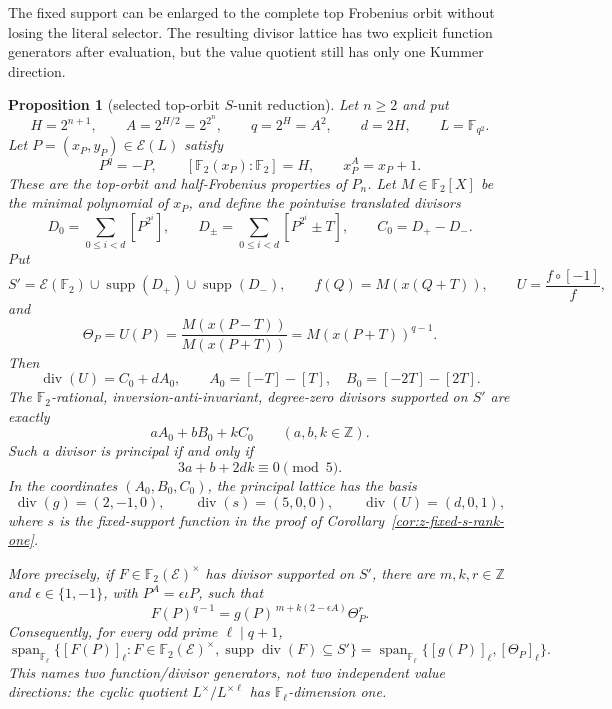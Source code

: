 \documentclass[11pt]{article}
\newtheorem{proposition}[theorem]{Proposition}
\theoremstyle{definition}
\theoremstyle{remark}
\begin{document}
The fixed support can be enlarged to the complete top Frobenius orbit without
losing the literal selector.  The resulting divisor lattice has two explicit
function generators after evaluation, but the value quotient still has only
one Kummer direction.

\begin{proposition}[selected top-orbit $S$-unit reduction]
\label{prop:z-top-orbit-units}
Let $n\geq2$ and put
\[
 H=2^{n+1},\qquad A=2^{H/2}=2^{2^n},\qquad
 q=2^H=A^2,\qquad d=2H,\qquad L=\mathbb F_{q^2}.
\]
Let $P=(x_P,y_P)\in\mathcal E(L)$ satisfy
\[
 P^q=-P,\qquad [\mathbb F_2(x_P):\mathbb F_2]=H,
 \qquad x_P^A=x_P+1.
\]
These are the top-orbit and half-Frobenius properties of $P_n$.  Let
$M\in\mathbb F_2[X]$ be the minimal polynomial of $x_P$, and define the
pointwise translated divisors
\[
 D_0=\sum_{0\leq i<d}[P^{2^i}],\qquad
 D_\pm=\sum_{0\leq i<d}[P^{2^i}\pm T],\qquad
 C_0=D_+-D_-.
\]
Put
\[
 S'=\mathcal E(\mathbb F_2)\cup\operatorname{supp}(D_+)
       \cup\operatorname{supp}(D_-),
 \qquad f(Q)=M(x(Q+T)),
 \qquad U=\frac{f\circ[-1]}f,
\]
and
\[
 \Theta_P=U(P)
 =\frac{M(x(P-T))}{M(x(P+T))}
 =M(x(P+T))^{q-1}.
\]
Then
\[
 \operatorname{div}(U)=C_0+dA_0,
 \qquad A_0=[-T]-[T],\quad B_0=[-2T]-[2T].
\]
The $\mathbb F_2$-rational, inversion-anti-invariant, degree-zero divisors
supported on $S'$ are exactly
\[
 aA_0+bB_0+kC_0\qquad(a,b,k\in\mathbb Z).
\]
Such a divisor is principal if and only if
\[
 3a+b+2dk\equiv0\pmod5.
\]
In the coordinates $(A_0,B_0,C_0)$, the principal lattice has the basis
\[
 \operatorname{div}(g)=(2,-1,0),\qquad
 \operatorname{div}(s)=(5,0,0),\qquad
 \operatorname{div}(U)=(d,0,1),
\]
where $s$ is the fixed-support function in the proof of
Corollary~\ref{cor:z-fixed-s-rank-one}.

More precisely, if $F\in\mathbb F_2(\mathcal E)^\times$ has divisor supported
on $S'$, there are $m,k,r\in\mathbb Z$ and
$\epsilon\in\{1,-1\}$, with $P^A=\epsilon\iota P$, such that
\[
 F(P)^{q-1}=g(P)^{\,m+k(2-\epsilon A)}\Theta_P^r.
\]
Consequently, for every odd prime $\ell\mid q+1$,
\[
 \operatorname{span}_{\mathbb F_\ell}
 \bigl\{[F(P)]_\ell:
       F\in\mathbb F_2(\mathcal E)^\times,
       \operatorname{supp}\operatorname{div}(F)\subseteq S'\bigr\}
 =\operatorname{span}_{\mathbb F_\ell}
   \{[g(P)]_\ell,[\Theta_P]_\ell\}.
\]
This names two function/divisor generators, not two independent value
directions: the cyclic quotient $L^\times/L^{\times\ell}$ has
$\mathbb F_\ell$-dimension one.
\end{proposition}
\end{document}

